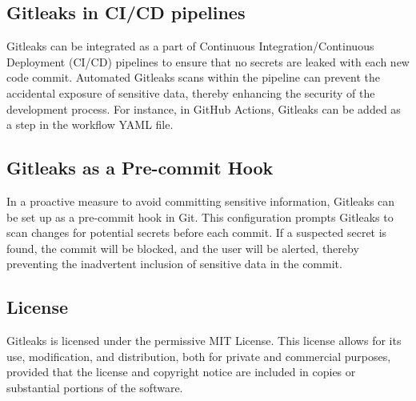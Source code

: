 \subsection{Gitleaks in CI/CD pipelines}\label{subsec:gitleaks-cicd}

Gitleaks can be integrated as a part of Continuous Integration/Continuous Deployment (CI/CD) pipelines to ensure that no secrets are leaked with each new code commit.
Automated Gitleaks scans within the pipeline can prevent the accidental exposure of sensitive data, thereby enhancing the security of the development process.
For instance, in GitHub Actions, Gitleaks can be added as a step in the workflow YAML file.

\subsection{Gitleaks as a Pre-commit Hook}\label{subsec:gitleaks-precommit}

In a proactive measure to avoid committing sensitive information, Gitleaks can be set up as a pre-commit hook in Git.
This configuration prompts Gitleaks to scan changes for potential secrets before each commit.
If a suspected secret is found, the commit will be blocked, and the user will be alerted, thereby preventing the inadvertent inclusion of sensitive data in the commit.

\subsection{License}\label{subsec:gitleaks-license}

Gitleaks is licensed under the permissive MIT License.
This license allows for its use, modification, and distribution, both for private and commercial purposes, provided that the license and copyright notice are included in copies or substantial portions of the software.